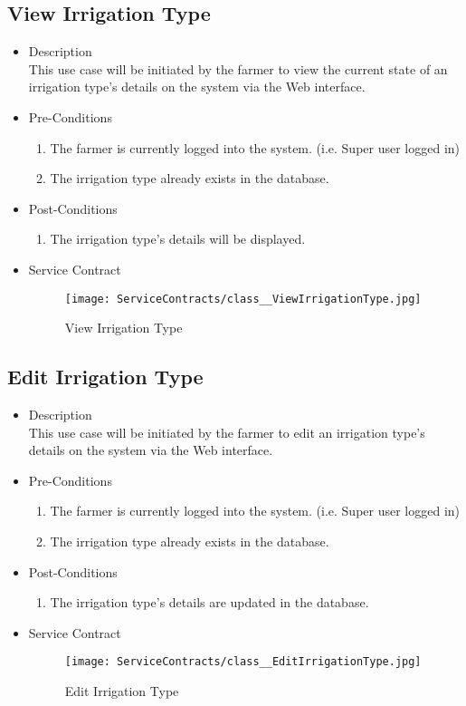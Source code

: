 \documentclass[11pt,fleqn]{book} %
\begin{document}
\subsection{View Irrigation Type}
\begin{itemize}
	\item Description\\
	This use case will be initiated by the farmer to view the current state of an irrigation type’s details on the system via the Web interface.
	\item Pre-Conditions
	\begin{enumerate}
		\item The farmer is currently logged into the system. (i.e. Super user logged in)
		\item The irrigation type already exists in the database.				
	\end{enumerate}
	\item Post-Conditions
	\begin{enumerate}
		\item The irrigation type’s details will be displayed.
	\end{enumerate}
	\item Service Contract
	\begin{figure}
		\texttt{[image: ServiceContracts/class\_\_ViewIrrigationType.jpg]}
		\caption{View Irrigation Type}
	\end{figure}
\end{itemize}

\subsection{Edit Irrigation Type}
\begin{itemize}
	\item Description\\
	This use case will be initiated by the farmer to edit an irrigation type’s details on the system via the Web interface.
	\item Pre-Conditions
	\begin{enumerate}
		\item The farmer is currently logged into the system. (i.e. Super user logged in)
		\item The irrigation type already exists in the database.					
	\end{enumerate}
	\item Post-Conditions
	\begin{enumerate}
		\item The irrigation type’s details are updated in the database.
	\end{enumerate}
	\item Service Contract
	\begin{figure}
		\texttt{[image: ServiceContracts/class\_\_EditIrrigationType.jpg]}
		\caption{Edit Irrigation Type}
	\end{figure}
\end{itemize}
\end{document}
